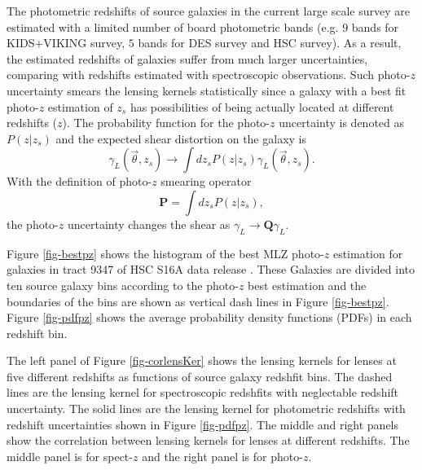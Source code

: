 \documentclass[twocolumn]{aastex62}
\begin{document}
The photometric redshifts of source galaxies in the current large scale survey are estimated with a limited number of 
board photometric bands (e.g. $9$ bands for KIDS$+$VIKING survey, $5$ bands for DES survey and HSC survey). As a result, 
the estimated redshifts of galaxies suffer from much larger uncertainties, comparing with redshifts estimated with 
spectroscopic observations. Such photo-$z$ uncertainty smears the lensing kernels statistically since a galaxy with a 
best fit photo-$z$ estimation of $z_s$ has possibilities of being actually located at different redshifts ($z$).
The probability function for the photo-$z$ uncertainty is denoted as $P(z|z_s)$ and the expected shear distortion on 
the galaxy is
\begin{equation}\label{eq-delta2gamma-poz}
\gamma_L(\vec{\theta},z_s) \rightarrow \int dz_s P(z|z_s) \gamma_L(\vec{\theta},z_s).
\end{equation}
With the definition of photo-$z$ smearing operator
\begin{equation}
\mathbf{P} = \int dz_s P(z|z_s),
\end{equation}
the photo-$z$ uncertainty changes the shear as $\gamma_L \rightarrow \mathbf{Q} \gamma_L$.

Figure \ref{fig-bestpz} shows the histogram of the best MLZ photo-$z$ estimation \cite{HSC1-photoz} for galaxies in tract 
9347 of HSC S16A data release \citep{HSC1-data}. These Galaxies are divided into ten source galaxy bins according to the 
photo-$z$ best estimation and the boundaries of the bins are shown as vertical dash lines in Figure \ref{fig-bestpz}. Figure \ref{fig-pdfpz} shows the average probability density functions (PDFs) in each redshift bin. 

The left panel of Figure \ref{fig-corlensKer} shows the lensing kernels for lenses at five different redshifts as functions 
of source galaxy redshfit bins. The dashed lines are the lensing kernel for spectroscopic redshfits with neglectable redshift 
uncertainty. The solid lines are the lensing kernel for photometric redshifts with redshift uncertainties shown in Figure 
\ref{fig-pdfpz}. The middle and right panels show the correlation between lensing kernels for lenses at different redshifts. 
The middle panel is for spect-$z$ and the right panel is for photo-$z$.
\end{document}

